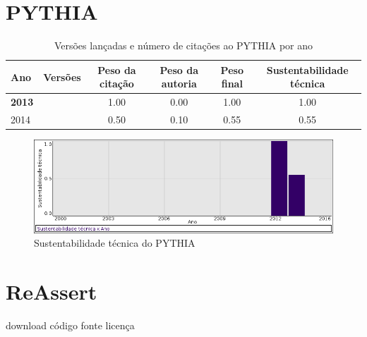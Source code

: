 \section{PYTHIA}


\begin{table}[H]
\caption{Versões lançadas e número de citações ao PYTHIA por ano}
\centering
\begin{tabular}{| l | c | c | c | c | c |}
  \hline
  Ano & Versões & Peso da citação & Peso da autoria & Peso final & Sustentabilidade técnica \\
  \hline
            {\bf 2013}
          &
          
          &
          1.00
          &
          0.00
          &
          1.00
          &
            {\color{blue} 1.00}
          \\
\hline
            2014
          &
          
          &
          0.50
          &
          0.10
          &
          0.55
          &
            {\color{blue} 0.55}
          \\
\hline
\end{tabular}
\end{table}

\begin{figure}[h]
  \center
  \includegraphics[scale=0.50]{imagens/softwares-charts/pythia.png}
  \caption{Sustentabilidade técnica do PYTHIA}
\end{figure}


\section{ReAssert}
\checkmark download
\checkmark código fonte
\checkmark licença


